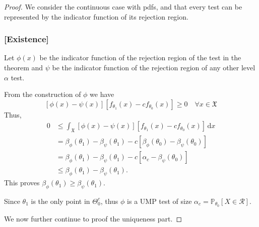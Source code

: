 \begin{proof}
    We consider the continuous case with pdfs, and that every test can be represented 
    by the indicator function of its rejection region.

    \subsubsection*{[Existence]}
    Let $\phi(x)$ be the indicator function of the rejection region of the test in 
    the theorem and $\psi$ be the indicator function of the rejection region of any other 
    level $\alpha$ test.

    From the construction of $\phi$ we have 
    \[
        [\phi(x) - \psi(x)][f_{\theta_1}(x) - cf_{\theta_0}(x)] \geq 0 \quad \forall x \in \mathfrak{X}
    \]
    Thus,
    \begin{align*}
        0 &\leq \int_{\mathfrak{X}} [\phi(x) - \psi(x)][f_{\theta_1}(x) - cf_{\theta_0}(x)] \, \mathrm{d}x\\
        &= \beta_\phi(\theta_1) - \beta_\psi(\theta_1) - c[\beta_\phi(\theta_0) - \beta_\psi(\theta_0)]\\
        &= \beta_\phi(\theta_1) - \beta_\psi(\theta_1) - c[\alpha_c - \beta_\psi(\theta_0)]\\
        &\leq \beta_\phi(\theta_1) - \beta_\psi(\theta_1).
    \end{align*}
    This proves $\beta_\phi(\theta_1) \geq \beta_\psi(\theta_1)$.

    Since $\theta_1$ is the only point in $\Theta_0^c$, thus 
    $\phi$ is a UMP test of size $\alpha_c = \mathbb{P}_{\theta_0}[X \in \mathcal{R}]$. 

    We now further continue to proof the uniqueness part.


\end{proof}
